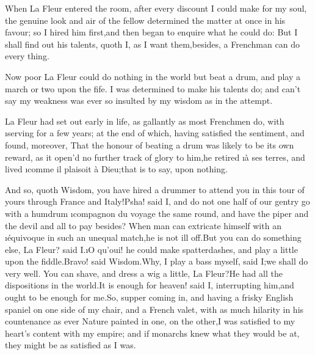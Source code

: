 \documentclass[twoside]{article}
\begin{document}
When La Fleur entered the room, after every discount I could make for my
soul, the genuine look and air of the fellow determined the matter at
once in his favour; so I hired him first,\tsk and then began to enquire what
he could do: But I shall find out his talents, quoth I, as I want
them,\tsk besides, a Frenchman can do every thing.

Now poor La Fleur could do nothing in the world but beat a drum, and play
a march or two upon the fife.  I was determined to make his talents do;
and can’t say my weakness was ever so insulted by my wisdom as in the
attempt.

La Fleur had set out early in life, as gallantly as most Frenchmen do,
with \i{serving} for a few years; at the end of which, having satisfied the
sentiment, and found, moreover, That the honour of beating a drum was
likely to be its own reward, as it open’d no further track of glory to
him,\tsk he retired \i{à ses terres}, and lived \i{comme il plaisoit à
Dieu};\tsk that is to say, upon nothing.

\tsk And so, quoth Wisdom, you have hired a drummer to attend you in this
tour of yours through France and Italy!\tsk Psha! said I, and do not one half
of our gentry go with a humdrum \i{compagnon du voyage} the same round, and
have the piper and the devil and all to pay besides?  When man can
extricate himself with an \i{équivoque} in such an unequal match,\tsk he is not
ill off.\tsk But you can do something else, La Fleur? said I.\tsk \i{O qu’oui}! he
could make spatterdashes, and play a little upon the fiddle.\tsk Bravo! said
Wisdom.\tsk Why, I play a bass myself, said I;\tsk we shall do very well.  You
can shave, and dress a wig a little, La Fleur?\tsk He had all the
dispositions in the world.\tsk It is enough for heaven! said I, interrupting
him,\tsk and ought to be enough for me.\tsk So, supper coming in, and having a
frisky English spaniel on one side of my chair, and a French valet, with
as much hilarity in his countenance as ever Nature painted in one, on the
other,\tsk I was satisfied to my heart’s content with my empire; and if
monarchs knew what they would be at, they might be as satisfied as I was.




\end{document}
